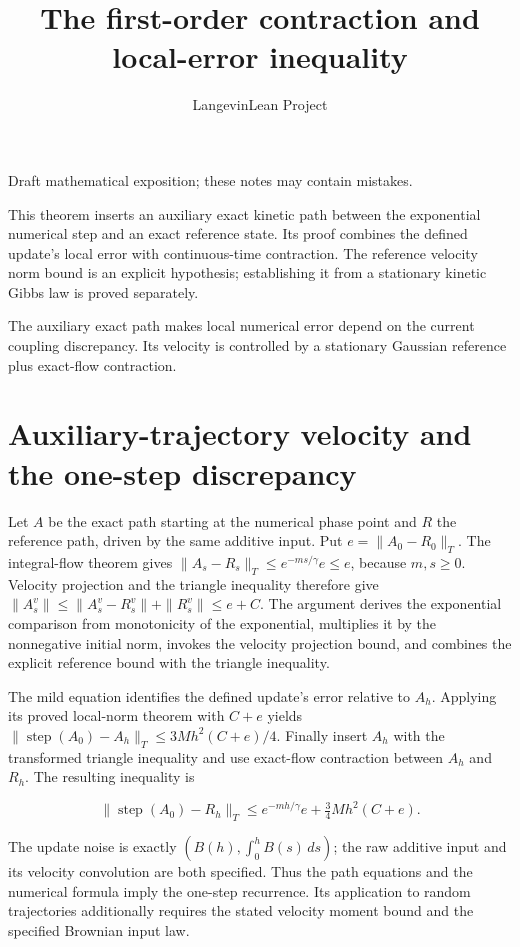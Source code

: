 \documentclass[11pt,a4paper]{article}
\title{\texorpdfstring{The first-order contraction and local-error inequality}{The first-order contraction and local-error inequality}}
\author{LangevinLean Project}
\date{}
\begin{document}
\maketitle
Draft mathematical exposition; these notes may contain mistakes.


This theorem inserts an auxiliary exact kinetic path between the exponential numerical step and an exact reference state. Its proof combines the defined update's local error with continuous-time contraction. The reference velocity norm bound is an explicit hypothesis; establishing it from a stationary kinetic Gibbs law is proved separately.



The auxiliary exact path makes local numerical error depend on the current coupling discrepancy. Its velocity is controlled by a stationary Gaussian reference plus exact-flow contraction.


\section{\texorpdfstring{Auxiliary-trajectory velocity and the one-step discrepancy}{Auxiliary-trajectory velocity and the one-step discrepancy}}


Let \(A\) be the exact path starting at the numerical phase point and \(R\) the reference path, driven by the same additive input. Put \(e=\|A_0-R_0\|_T\). The integral-flow theorem gives \(\|A_s-R_s\|_T\le e^{-ms/\gamma}e\le e\), because \(m,s\ge0\). Velocity projection and the triangle inequality therefore give \(\|A_s^v\|\le\|A_s^v-R_s^v\|+\|R_s^v\|\le e+C\). The argument derives the exponential comparison from monotonicity of the exponential, multiplies it by the nonnegative initial norm, invokes the velocity projection bound, and combines the explicit reference bound with the triangle inequality.



The mild equation identifies the defined update's error relative to \(A_h\). Applying its proved local-norm theorem with \(C+e\) yields \(\|\operatorname{step}(A_0)-A_h\|_T\le3Mh^2(C+e)/4\). Finally insert \(A_h\) with the transformed triangle inequality and use exact-flow contraction between \(A_h\) and \(R_h\). The resulting inequality is

\[\|\operatorname{step}(A_0)-R_h\|_T\le e^{-mh/\gamma}e+\tfrac34Mh^2(C+e).\]

The update noise is exactly \((B(h),\int_0^hB(s)\,ds)\); the raw additive input and its velocity convolution are both specified. Thus the path equations and the numerical formula imply the one-step recurrence. Its application to random trajectories additionally requires the stated velocity moment bound and the specified Brownian input law.
\end{document}
